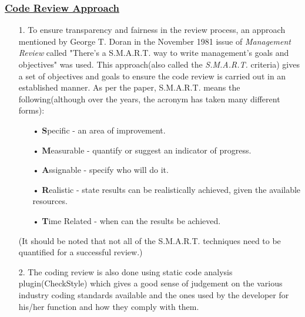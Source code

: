 \documentclass[12pt]{report}
\begin{document}
	\subsubsection{\underline{Code Review Approach}}
	\begin{enumerate}
		\item[1.] To ensure transparency  and fairness in the review process, an approach mentioned by George T. Doran in the November 1981 issue of \textit{Management Review} called "There's a S.M.A.R.T. way to write management's goals and objectives" was used. This approach(also called the \textit{S.M.A.R.T.} criteria) gives a set of objectives and goals to ensure the code review is carried out in an established manner. As per the paper, S.M.A.R.T. means the following(although over the years, the acronym has taken many different forms):
	\begin{itemize}
	\item[•]\textbf{S}pecific - an area of improvement.
	\item[•]\textbf{M}easurable - quantify or suggest an indicator of progress.
	\item[•]\textbf{A}ssignable - specify who will do it.
	\item[•]\textbf{R}ealistic - state results can be realistically achieved, given the available resources.  
	\item[•]\textbf{T}ime Related - when can the results be achieved.
	\end{itemize}
	(It should be noted that not all of the S.M.A.R.T. techniques need to be quantified for a successful review.)
		\item[2.] The coding review is also done using static code analysis plugin(CheckStyle) which gives a good sense of judgement on the various industry coding standards available and the ones used by the developer for his/her function and how they comply with them.
    \end{enumerate}		
\end{document}

